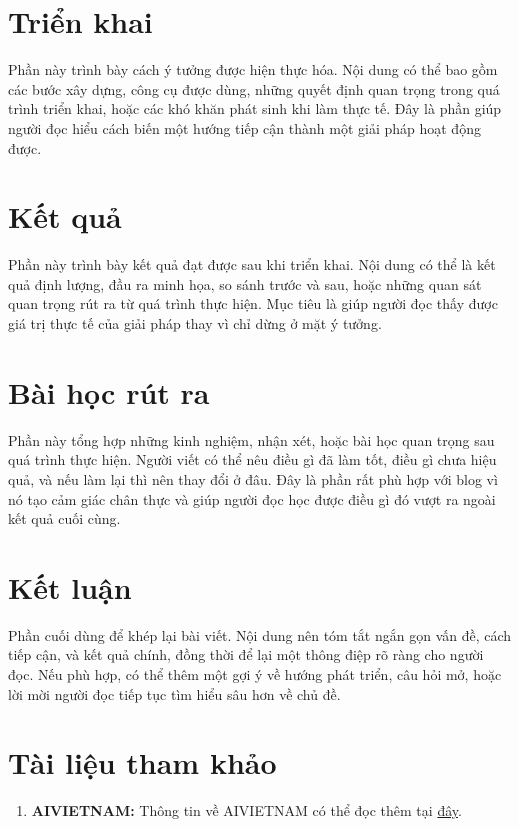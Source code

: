 \documentclass[12pt]{ai_conquer2026}
\begin{document}
\section{Triển khai}

Phần này trình bày cách ý tưởng được hiện thực hóa. Nội dung có thể bao gồm các bước xây dựng, công cụ được dùng, những quyết định quan trọng trong quá trình triển khai, hoặc các khó khăn phát sinh khi làm thực tế. Đây là phần giúp người đọc hiểu cách biến một hướng tiếp cận thành một giải pháp hoạt động được.

\section{Kết quả}

Phần này trình bày kết quả đạt được sau khi triển khai. Nội dung có thể là kết quả định lượng, đầu ra minh họa, so sánh trước và sau, hoặc những quan sát quan trọng rút ra từ quá trình thực hiện. Mục tiêu là giúp người đọc thấy được giá trị thực tế của giải pháp thay vì chỉ dừng ở mặt ý tưởng.

\section{Bài học rút ra}

Phần này tổng hợp những kinh nghiệm, nhận xét, hoặc bài học quan trọng sau quá trình thực hiện. Người viết có thể nêu điều gì đã làm tốt, điều gì chưa hiệu quả, và nếu làm lại thì nên thay đổi ở đâu. Đây là phần rất phù hợp với blog vì nó tạo cảm giác chân thực và giúp người đọc học được điều gì đó vượt ra ngoài kết quả cuối cùng.

\section{Kết luận}

Phần cuối dùng để khép lại bài viết. Nội dung nên tóm tắt ngắn gọn vấn đề, cách tiếp cận, và kết quả chính, đồng thời để lại một thông điệp rõ ràng cho người đọc. Nếu phù hợp, có thể thêm một gợi ý về hướng phát triển, câu hỏi mở, hoặc lời mời người đọc tiếp tục tìm hiểu sâu hơn về chủ đề.

\newpage
\section{Tài liệu tham khảo}
\label{section:references}
\nocite{*}
\vspace{-3.2em}
\printbibliography

\newpage
\begin{appendices}
\begin{enumerate}
    \item \textbf{AIVIETNAM:} Thông tin về AIVIETNAM có thể đọc thêm tại \href{https://aivietnam.edu.vn/}{đây}.
\end{enumerate}
\end{appendices}
\end{document}
